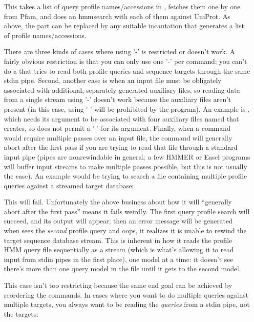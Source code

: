 This takes a list of query profile names/accessions in
, fetches them one by one from Pfam, and does an
hmmsearch with each of them against UniProt. As above, the  part can be replaced by any suitable incantation
that generates a list of profile names/accessions.

There are three kinds of cases where using '-' is restricted or
doesn't work. A fairly obvious restriction is that you can only use
one '-' per command; you can't do a  that tries to
read both profile queries and sequence targets through the same stdin
pipe. Second, another case is when an input file must be obligately
associated with additional, separately generated auxiliary files, so
reading data from a single stream using '-' doesn't work because the
auxiliary files aren't present (in this case, using '-' will be
prohibited by the program). An example is , which needs
its  argument to be associated with four auxiliary
files named  that  creates,
so  does not permit a '-' for its 
argument. Finally, when a command would require multiple passes over
an input file, the command will generally abort after the first pass
if you are trying to read that file through a standard input pipe
(pipes are nonrewindable in general; a few HMMER or Easel programs
will buffer input streams to make multiple passes possible, but this
is not usually the case). An example would be trying to search a file
containing multiple profile queries against a streamed target
database:


This will fail. Unfortunately the above business about how it will
``generally abort after the first pass'' means it fails weirdly. The
first query profile search will succeed, and its output will appear;
then an error message will be generated when  sees the
\emph{second} profile query and oops, it realizes it is unable to
rewind the target sequence database stream. This is inherent in how it
reads the profile HMM query file sequentially as a stream (which is
what's allowing it to read input from stdin pipes in the first place),
one model at a time: it doesn't see there's more than one query model
in the file until it gets to the second model.

This case isn't too restricting because the same end goal can be
achieved by reordering the commands. In cases where you want to do
multiple queries against multiple targets, you always want to be
reading the \emph{queries} from a stdin pipe, not the targets:


